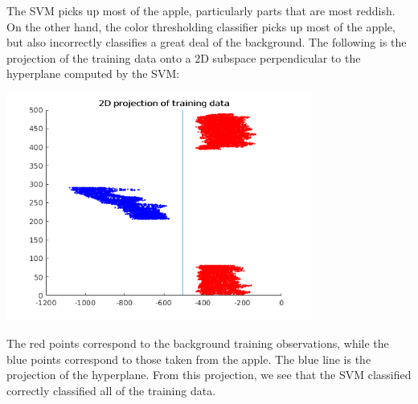 \documentclass[letterpaper,12pt]{article}
\begin{document}
\begin{enumerate}
\begin{center}
  \end{center}
  The SVM picks up most of the apple, particularly parts that are most
  reddish. On the other hand, the color thresholding classifier picks
  up most of the apple, but also incorrectly classifies a great deal
  of the background. The following is the projection of the training
  data onto a 2D subspace perpendicular to the hyperplane computed by
  the SVM:
  \begin{center}
    \includegraphics[width=10cm]{apple_proj.png}
  \end{center}
  The red points correspond to the background training observations,
  while the blue points correspond to those taken from the apple. The
  blue line is the projection of the hyperplane. From this projection,
  we see that the SVM classified correctly classified all of the
  training data.


\end{enumerate}
\end{document}
